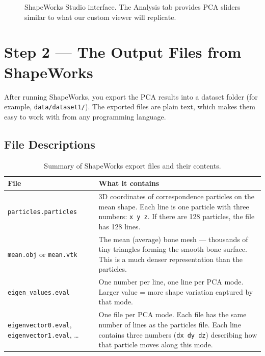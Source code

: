 \documentclass[12pt,a4paper]{article}
\begin{document}
\begin{figure}[H]
    \centering
    \caption{ShapeWorks Studio interface. The Analysis tab provides PCA sliders similar to what our custom viewer will replicate.}
    \label{fig:shapeworks_studio}
\end{figure}

\section{Step 2 --- The Output Files from ShapeWorks}

After running ShapeWorks, you export the PCA results into a dataset folder (for example, \texttt{data/dataset1/}). The exported files are plain text, which makes them easy to work with from any programming language.

\subsection{File Descriptions}

\begin{table}[H]
\centering
\renewcommand{\arraystretch}{1.4}
\begin{tabular}{@{}lp{9.5cm}@{}}
\toprule
\textbf{File} & \textbf{What it contains} \\
\midrule
\texttt{particles.particles} & 3D coordinates of correspondence particles on the mean shape. Each line is one particle with three numbers: \texttt{x y z}. If there are 128 particles, the file has 128 lines. \\
\texttt{mean.obj} or \texttt{mean.vtk} & The mean (average) bone mesh --- thousands of tiny triangles forming the smooth bone surface. This is a much denser representation than the particles. \\
\texttt{eigen\_values.eval} & One number per line, one line per PCA mode. Larger value = more shape variation captured by that mode. \\
\texttt{eigenvector0.eval}, \texttt{eigenvector1.eval}, \ldots & One file per PCA mode. Each file has the same number of lines as the particles file. Each line contains three numbers (\texttt{dx dy dz}) describing how that particle moves along this mode. \\
\bottomrule
\end{tabular}
\caption{Summary of ShapeWorks export files and their contents.}
\label{tab:files}
\end{table}
\end{document}
